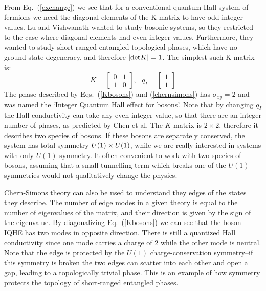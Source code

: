 From Eq.~(\ref{exchange}) we see that for a conventional quantum Hall system of fermions we need the diagonal elements of the K-matrix to have odd-integer values. Lu and Vishwanath wanted to study bosonic systems, so they restricted to the case where diagonal elements had even integer values. Furthermore, they wanted to study short-ranged entangled topological phases, which have no ground-state degeneracy, and therefore $|{\rm det}K|=1$. The simplest such K-matrix is:
\begin{equation}
K=\left[\begin{array}{cc} 0 & 1 \\ 1 & 0\end{array}\right],~~~q_I=\left[\begin{array}{cc} 1\\ 1 \end{array}\right]
\label{Kbosons}
\end{equation}
The phase described by Eqs.~(\ref{Kbosons}) and (\ref{chernsimons}) has $\sigma_{xy}=2$ and was named the `Integer Quantum Hall effect for bosons'. Note that by changing $q_I$ the Hall conductivity can take any even integer value, so that there are an integer number of phases, as predicted by Chen et al.\cite{WenScience,WenPRB} The $K$-matrix is $2\times2$, therefore it describes two species of bosons. If these bosons are separately conserved, the system has total symmetry $U(1)\times U(1)$, while we are really interested in systems with only $U(1)$ symmetry. It often convenient to work with two species of bosons, assuming that a small tunnelling term which breaks one of the $U(1)$ symmetries would not qualitatively change the physics. 

Chern-Simons theory can also be used to understand they edges of the states they describe. The number of edge modes in a given theory is equal to the number of eigenvalues of the matrix, and their direction is given by the sign of the eigenvalue. By diagonalizing Eq.~(\ref{Kbosons}) we can see that the boson IQHE has two modes in opposite direction. There is still a quantized Hall conductivity since one mode carries a charge of $2$ while the other mode is neutral. Note that the edge is protected by the $U(1)$ charge-conservation symmetry--if this symmetry is broken the two edges can scatter into each other and open a gap, leading to a topologically trivial phase. This is an example of how symmetry protects the topology of short-ranged entangled phases.

